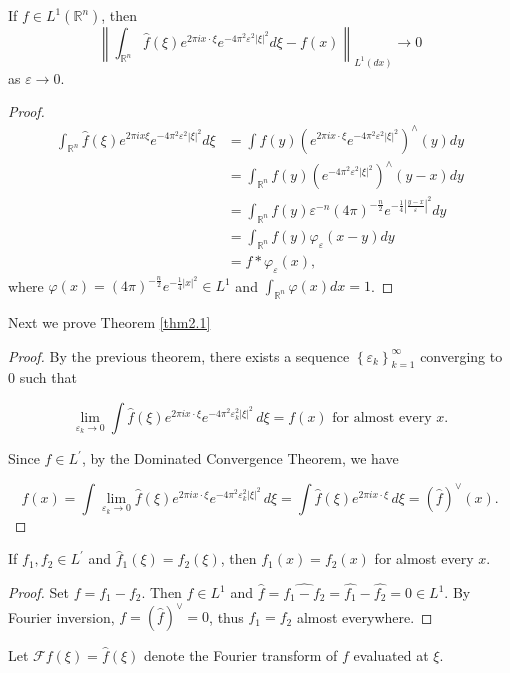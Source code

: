 \begin{theorem}
    If $f \in L^{1}\left(\mathbb{R}^n\right)$, then
$$
\left\| \int_{\mathbb{R}^n} \hat{f}(\xi) e^{2 \pi i x \cdot \xi} e^{-4 \pi^2 \varepsilon^2|\xi|^2} d\xi - f(x) \right\|_{L^{1}(dx)} \rightarrow 0
$$
as $\varepsilon \rightarrow 0$.
\end{theorem}
\begin{proof}
    $$
\begin{aligned}
\int_{\mathbb{R}^n}\hat{f}(\xi) e^{2 \pi i x \xi} e^{-4 \pi^2 \varepsilon^2|\xi|^2} d\xi &= \int f(y) \left(e^{2 \pi i x \cdot \xi} e^{-4 \pi^2 \varepsilon^2|\xi|^2}\right)^{\wedge}(y) dy \\
&= \int_{\mathbb{R}^n} f(y) \left(e^{-4 \pi^2 \varepsilon^2|\xi|^2}\right)^{\wedge}(y-x) dy \\
&= \int_{\mathbb{R}^n} f(y) \varepsilon^{-n}(4 \pi)^{-\frac{n}{2}} e^{-\frac{1}{4}\left|\frac{y-x}{\varepsilon}\right|^2} dy \\
&= \int_{\mathbb{R}^n} f(y) \varphi_{\varepsilon}(x-y) dy \\
&= f * \varphi_{\varepsilon}(x),
\end{aligned}
$$
where $\varphi(x) = (4 \pi)^{-\frac{n}{2}} e^{-\frac{1}{4}|x|^2} \in L^1$ and $\int_{\mathbb{R}^n}\varphi(x) dx= 1$.
\end{proof}
Next we prove Theorem \ref{thm2.1}
\begin{proof}
    By the previous theorem, there exists a sequence $\left\{{\varepsilon_k}\right\}_{k=1}^{\infty}$ converging to 0 such that

$$\lim_{{\varepsilon_k \rightarrow 0}} \int \hat{f}(\xi) e^{2 \pi i x \cdot \xi} e^{-4 \pi^2 \varepsilon_k^2|\xi|^2} \, d\xi = f(x) \text{ for almost every } x.$$

Since $\hat{f} \in L^{\prime}$, by the Dominated Convergence Theorem, we have

$$f(x) = \int \lim_{{\varepsilon_k \rightarrow 0}} \hat{f}(\xi) e^{2 \pi i x \cdot \xi} e^{-4 \pi^2 \varepsilon_k^2|\xi|^2} \, d\xi = \int \hat{f}(\xi) e^{2 \pi i x \cdot \xi} \, d\xi = (\hat{f})^{\vee}(x).$$
\end{proof}
\begin{corollary}
    If $f_1, f_2 \in L^{\prime}$ and $\hat{f}_1(\xi) = \hat{f}_2(\xi)$, then $f_1(x) = f_2(x)$ for almost every $x$.
\end{corollary}
\begin{proof}
    Set $f = f_1 - f_2$. Then $f \in L^1$ and $\hat{f} = \widehat{f_1 - f_2} = \hat{f_1} - \hat{f_2} = 0 \in L^1$.
By Fourier inversion, $f = (\hat{f})^{\vee} = 0$, thus $f_1 = f_2$ almost everywhere.
\end{proof}
\begin{rmk}
    Let $\mathcal{F}f(\xi) = \hat{f}(\xi)$ denote the Fourier transform of $f$ evaluated at $\xi$.
\end{rmk} 